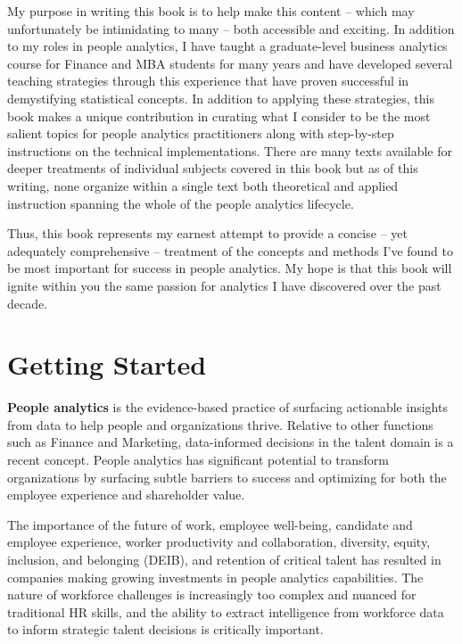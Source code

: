 \documentclass[
]{book}
\begin{document}
My purpose in writing this book is to help make this content -- which may unfortunately be intimidating to many -- both accessible and exciting. In addition to my roles in people analytics, I have taught a graduate-level business analytics course for Finance and MBA students for many years and have developed several teaching strategies through this experience that have proven successful in demystifying statistical concepts. In addition to applying these strategies, this book makes a unique contribution in curating what I consider to be the most salient topics for people analytics practitioners along with step-by-step instructions on the technical implementations. There are many texts available for deeper treatments of individual subjects covered in this book but as of this writing, none organize within a single text both theoretical and applied instruction spanning the whole of the people analytics lifecycle.

Thus, this book represents my earnest attempt to provide a concise -- yet adequately comprehensive -- treatment of the concepts and methods I've found to be most important for success in people analytics. My hope is that this book will ignite within you the same passion for analytics I have discovered over the past decade.

\hypertarget{getting-started}{%
\chapter{Getting Started}\label{getting-started}}

\textbf{People analytics} is the evidence-based practice of surfacing actionable insights from data to help people and organizations thrive. Relative to other functions such as Finance and Marketing, data-informed decisions in the talent domain is a recent concept. People analytics has significant potential to transform organizations by surfacing subtle barriers to success and optimizing for both the employee experience and shareholder value.

The importance of the future of work, employee well-being, candidate and employee experience, worker productivity and collaboration, diversity, equity, inclusion, and belonging (DEIB), and retention of critical talent has resulted in companies making growing investments in people analytics capabilities. The nature of workforce challenges is increasingly too complex and nuanced for traditional HR skills, and the ability to extract intelligence from workforce data to inform strategic talent decisions is critically important.
\end{document}
